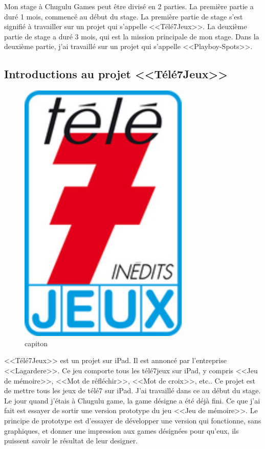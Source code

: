 Mon stage à Chugulu Games peut être divisé en 2 parties. La première partie a duré 1 mois, commencé au début du stage. La première partie de stage s'est signifié à travailler sur un projet qui s'appelle <<Télé7Jeux>>. La deuxième partie de stage a duré 3 mois, qui est la mission principale de mon stage. Dans la deuxième partie, j'ai travaillé sur un projet qui s'appelle <<Playboy-Spots>>.

\subsection{Introductions au projet <<Télé7Jeux>>} %

\begin{figure}[htbp]  \centering   \includegraphics[height=5in]{Image/tele_7_jeux_logo_lien_logo.jpg}  \caption{capiton}  \label{fig:Image_tele_7_jeux_logo_lien_logo} \end{figure}

<<Télé7Jeux>> est un projet sur iPad. Il est annoncé par l'entreprise <<Lagardere>>. Ce jeu comporte tous les télé7jeux sur iPad, y compris <<Jeu de mémoire>>, <<Mot de réfléchir>>, <<Mot de croix>>, etc.. Ce projet est de mettre tous les jeux de télé7 sur iPad.
J'ai travaillé dans ce au début du stage. Le jour quand j'étais à Chugulu game, la game désigne a été déjà fini. Ce que j'ai fait est essayer de sortir une version prototype du jeu <<Jeu de mémoire>>. Le principe de prototype est d'essayer de développer une version qui fonctionne, sans graphiques, et donner une impression aux games désignées pour qu'eux, ils puissent savoir le résultat de leur designer. 

